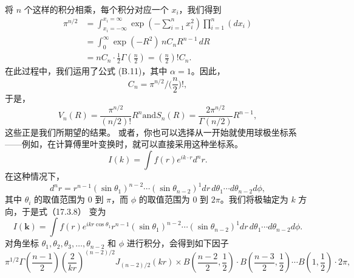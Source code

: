 将 \(n\) 个这样的积分相乘，每个积分对应一个 \(x_i\)，我们得到
\begin{equation}\tag{17.3.6}\label{eq:17.3.6}
\begin{aligned}
\pi^{n/2}
&=\int_{x_i=-\infty}^{x_i=\infty}
\exp\!\left(-\sum_{i=1}^{n}x_i^2\right)\prod_{i=1}^{n}(dx_i) \\
&=\int_0^{\infty}\exp(-R^2)\,nC_nR^{n-1}\,dR \\
&= nC_n\cdot\frac{1}{2}\Gamma\!\left(\frac{n}{2}\right)
=\left(\frac{n}{2}\right)!C_n.
\end{aligned}
\end{equation}
在此过程中，我们运用了公式 (B.11)，其中 \(\alpha = 1\)。因此，
\begin{equation}\tag{17.3.7}\label{eq:17.3.7}
C _ { n } = \pi ^{n / 2} \Big / \Big ( \frac { n } { 2 } \Big ) ! ,
\end{equation}
于是，
\begin{equation}\tag{17.3.8}\label{eq:17.3.8}
V _ { n } ( R ) = \frac { \pi ^{n / 2} } { ( n / 2 ) ! } R ^{n}  \mathrm { a n d }  S _ { n } ( R ) = \frac { 2 \pi ^{n / 2} } { \Gamma ( n / 2 ) } R ^{n - 1} ,
\end{equation}
这些正是我们所期望的结果。
或者，你也可以选择从一开始就使用球极坐标系——例如，在计算傅里叶变换时，就可以直接采用这种坐标系。
\begin{equation}\tag{17.3.9}\label{eq:17.3.9}
I ( k ) = \int f ( r ) e ^{i k \cdot r} d ^{n} r .
\end{equation}
在这种情况下，
\begin{equation}\tag{17.3.10}\label{eq:17.3.10}
d ^{n} r = r ^{n - 1} ( \sin \theta _ { 1 } ) ^{n - 2} \cdots ( \sin \theta _ { n - 2 } ) ^{1} d r \, d \theta _ { 1 } \cdots d \theta _ { n - 2 } d \phi ,
\end{equation}
其中 \(\theta_{i}\) 的取值范围为 0 到 \(\pi\)，而 \(\phi\) 的取值范围为 0 到 \(2\pi\)。我们将极轴定为 \(k\) 方向，于是式（17.3.8） 变为
\begin{equation}\tag{17.3.11}\label{eq:17.3.11}
I ( \pmb { k } ) = \int f ( r ) e ^{i k r \cos \theta _ { 1} } r ^{n - 1} ( \sin \theta _ { 1 } ) ^{n - 2} \cdots ( \sin \theta _ { n - 2 } ) ^{1} d r \, d \theta _ { 1 } \cdots d \theta _ { n - 2 } d \phi .
\end{equation}
对角坐标 \(\theta_{1}, \theta_{2}, \theta_{3}, \ldots, \theta_{n-2}\) 和 \(\phi\) 进行积分，会得到如下因子
\begin{equation}\tag{17.3.12}\label{eq:17.3.12}
\pi ^{1 / 2} \Gamma \left( \frac { n - 1 } { 2 } \right) \left( \frac { 2 } { k r } \right) ^{( n - 2 ) / 2} J _ { ( n - 2 ) / 2 } ( k r ) \times B \left( \frac { n - 2 } { 2 } , \frac { 1 } { 2 } \right) \cdot B \left( \frac { n - 3 } { 2 } , \frac { 1 } { 2 } \right) \cdots B \left( 1 , \frac { 1 } { 2 } \right) \cdot 2 \pi ,
\end{equation}
